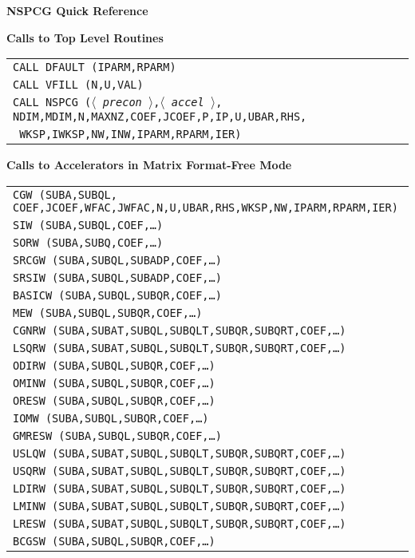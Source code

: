\oddsidemargin 0.0in 
\evensidemargin 0.0in
\pagestyle{empty}
\topmargin -0.5in
\textheight 9.0in 
\textwidth 6.5in 
\def \la{\langle}
\def \ra{\rangle}
\def \lb{\left[}
\def \rb{\right]}
\def \ha{\frac{1}{2}}


\centerline{\bf NSPCG Quick Reference}

\bigskip
\noindent
{\bf Calls to Top Level Routines}
\bigskip

\begin{tabular}{l}
{\tt   CALL DFAULT (IPARM,RPARM)} \\
{\tt   CALL VFILL (N,U,VAL)} \\
{\tt   CALL NSPCG ($\la$~{\em precon}~$\ra$,$\la$~{\em accel}~$\ra$,
      NDIM,MDIM,N,MAXNZ,COEF,JCOEF,P,IP,U,UBAR,RHS,} \\
{\tt \hspace*{2.5in} WKSP,IWKSP,NW,INW,IPARM,RPARM,IER) } 
\end{tabular}

\bigskip
\noindent
{\bf Calls to Accelerators in Matrix Format-Free Mode} 
\bigskip

\begin{tabular}{l}
{\tt CGW (SUBA,SUBQL,
  COEF,JCOEF,WFAC,JWFAC,N,U,UBAR,RHS,WKSP,NW,IPARM,RPARM,IER) } \\
{\tt SIW (SUBA,SUBQL,COEF,\ldots ) } \\
{\tt SORW (SUBA,SUBQ,COEF,\ldots ) } \\
{\tt SRCGW (SUBA,SUBQL,SUBADP,COEF,\ldots ) } \\
{\tt SRSIW (SUBA,SUBQL,SUBADP,COEF,\ldots ) } \\
{\tt BASICW (SUBA,SUBQL,SUBQR,COEF,\ldots ) } \\
{\tt MEW (SUBA,SUBQL,SUBQR,COEF,\ldots ) } \\
{\tt CGNRW (SUBA,SUBAT,SUBQL,SUBQLT,SUBQR,SUBQRT,COEF,\ldots ) } \\
{\tt LSQRW (SUBA,SUBAT,SUBQL,SUBQLT,SUBQR,SUBQRT,COEF,\ldots ) } \\
{\tt ODIRW (SUBA,SUBQL,SUBQR,COEF,\ldots ) } \\
{\tt OMINW (SUBA,SUBQL,SUBQR,COEF,\ldots ) } \\
{\tt ORESW (SUBA,SUBQL,SUBQR,COEF,\ldots ) } \\
{\tt IOMW (SUBA,SUBQL,SUBQR,COEF,\ldots ) } \\
{\tt GMRESW (SUBA,SUBQL,SUBQR,COEF,\ldots ) } \\
{\tt USLQW (SUBA,SUBAT,SUBQL,SUBQLT,SUBQR,SUBQRT,COEF,\ldots ) } \\
{\tt USQRW (SUBA,SUBAT,SUBQL,SUBQLT,SUBQR,SUBQRT,COEF,\ldots ) } \\
{\tt LDIRW (SUBA,SUBAT,SUBQL,SUBQLT,SUBQR,SUBQRT,COEF,\ldots ) } \\
{\tt LMINW (SUBA,SUBAT,SUBQL,SUBQLT,SUBQR,SUBQRT,COEF,\ldots ) } \\
{\tt LRESW (SUBA,SUBAT,SUBQL,SUBQLT,SUBQR,SUBQRT,COEF,\ldots ) } \\
{\tt BCGSW (SUBA,SUBQL,SUBQR,COEF,\ldots ) } 
\end{tabular}


